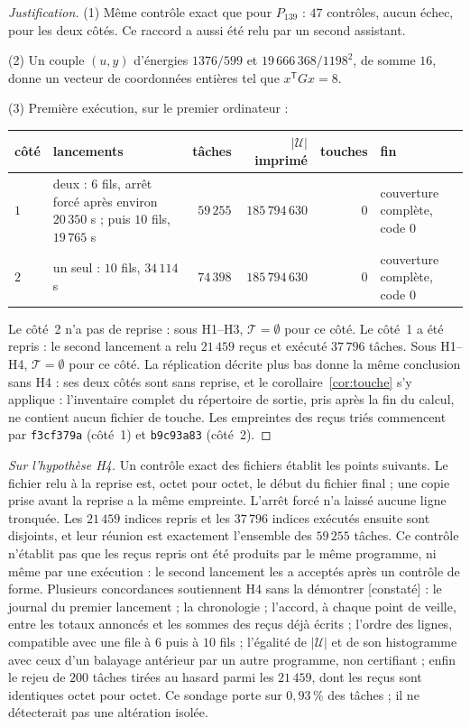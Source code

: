 \documentclass[11pt,a4paper]{amsart}
\theoremstyle{plain}
\theoremstyle{definition}
\numberwithin{equation}{section}
\newcommand{\Uc}{\mathcal{U}}
\newcommand{\Tc}{\mathcal{T}}
\newcommand{\st}[1]{\textup{\textsf{\small[#1]}}}
\newcommand{\CONS}{\st{constaté}}
\begin{document}
\begin{proof}[Justification]
(1) Même contrôle exact que pour $P_{139}$ : $47$ contrôles, aucun échec, pour les deux côtés. Ce raccord a aussi été relu par un second assistant.

(2) Un couple $(u,y)$ d'énergies $1376/599$ et $19\,666\,368/1198^2$, de somme $16$, donne un vecteur de coordonnées entières tel que $x^{\mathsf T}Gx=8$.

(3) Première exécution, sur le premier ordinateur :
\begin{center}\small
\begin{tabular}{l>{\raggedright\arraybackslash}p{4.4cm}rrr>{\raggedright\arraybackslash}p{2.7cm}}
\toprule
côté & lancements & tâches & $|\Uc|$ imprimé & touches & fin \\
\midrule
$1$ & deux : $6$ fils, arrêt forcé après environ $20\,350$ s ; puis $10$ fils, $19\,765$ s & $59\,255$ & $185\,794\,630$ & $0$ & couverture complète, code $0$ \\
$2$ & un seul : $10$ fils, $34\,114$ s & $74\,398$ & $185\,794\,630$ & $0$ & couverture complète, code $0$ \\
\bottomrule
\end{tabular}
\end{center}
Le côté~2 n'a pas de reprise : sous H1--H3, $\Tc=\emptyset$ pour ce côté. Le côté~1 a été repris : le second lancement a relu $21\,459$ reçus et exécuté $37\,796$ tâches. Sous H1--H4, $\Tc=\emptyset$ pour ce côté. La réplication décrite plus bas donne la même conclusion sans H4 : ses deux côtés sont sans reprise, et le corollaire~\ref{cor:touche} s'y applique : l'inventaire complet du répertoire de sortie, pris après la fin du calcul, ne contient aucun fichier de touche. Les empreintes des reçus triés commencent par \texttt{f3cf379a} (côté~1) et \texttt{b9c93a83} (côté~2).
\end{proof}

\emph{Sur l'hypothèse H4.} Un contrôle exact des fichiers établit les points suivants. Le fichier relu à la reprise est, octet pour octet, le début du fichier final ; une copie prise avant la reprise a la même empreinte. L'arrêt forcé n'a laissé aucune ligne tronquée. Les $21\,459$ indices repris et les $37\,796$ indices exécutés ensuite sont disjoints, et leur réunion est exactement l'ensemble des $59\,255$ tâches. Ce contrôle n'établit pas que les reçus repris ont été produits par le même programme, ni même par une exécution : le second lancement les a acceptés après un contrôle de forme. Plusieurs concordances soutiennent H4 sans la démontrer \CONS{} : le journal du premier lancement ; la chronologie ; l'accord, à chaque point de veille, entre les totaux annoncés et les sommes des reçus déjà écrits ; l'ordre des lignes, compatible avec une file à $6$ puis à $10$ fils ; l'égalité de $|\Uc|$ et de son histogramme avec ceux d'un balayage antérieur par un autre programme, non certifiant ; enfin le rejeu de $200$ tâches tirées au hasard parmi les $21\,459$, dont les reçus sont identiques octet pour octet. Ce sondage porte sur $0{,}93\,\%$ des tâches ; il ne détecterait pas une altération isolée.
\end{document}
